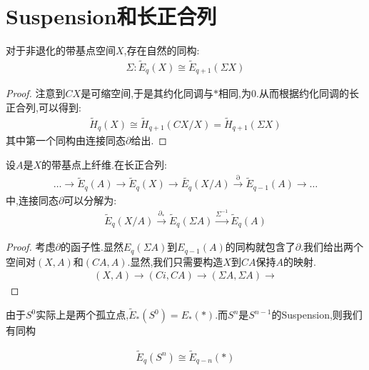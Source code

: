\section{Suspension和长正合列}
\begin{theorem}
    对于非退化的带基点空间$X$,存在自然的同构:
    \begin{align*}
        \Sigma:\tilde{E}_q(X)\cong \tilde{E}_{q+1}(\Sigma X)
    \end{align*}
\end{theorem}
\begin{proof}
    注意到$CX$是可缩空间,于是其约化同调与$*$相同,为$0$.从而根据约化同调的长正合列,可以得到:
    \begin{align*}
        \tilde{H}_q(X) \cong \tilde{H}_{q+1}(CX/X)=\tilde{H}_{q+1}(\Sigma X)
    \end{align*}
    其中第一个同构由连接同态$\partial$给出.
\end{proof}
\begin{corollary}
    设$A$是$X$的带基点上纤维.在长正合列:
    \begin{align*}
        \dots \rightarrow \tilde{E}_q(A) \rightarrow \tilde{E}_q(X) \rightarrow \tilde{E_q}(X/A) \stackrel{\partial}{\rightarrow} \tilde{E}_{q-1}(A) \to \dots
    \end{align*}
    中,连接同态$\partial$可以分解为:
    \begin{align*}
        \tilde{E}_q(X/A) \stackrel{\partial_*}{\rightarrow}\tilde{E}_q(\Sigma A) \stackrel{\Sigma^{-1}}{\rightarrow}\tilde{E}_q(A)
    \end{align*}
\end{corollary}
\begin{proof}
    考虑$\partial$的函子性.显然$E_q(\Sigma A)$到$E_{q-1}(A)$的同构就包含了$\partial$.我们给出两个空间对$(X,A)$和$(CA,A)$.显然,我们只需要构造$X$到$CA$保持$A$的映射.
    \begin{align*}
        (X,A) \to (Ci,CA) \to (\Sigma A,\Sigma A) \to  
    \end{align*}
\end{proof}
由于$S^0$实际上是两个孤立点,$\tilde{E}_*(S^0)=E_*(*)$.而$S^n$是$S^{n-1}$的Suspension,则我们有同构
\begin{corollary}
    \begin{align*}
       \tilde{E}_q(S^n)\cong  \tilde{E}_{q-n}(*)
    \end{align*}
    
\end{corollary}

